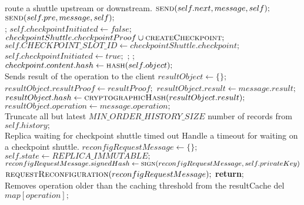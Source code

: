 \begin{algorithmic}[1]
 \Comment route a shuttle upstream or downstream.
    	\State $\Call{send}{self.next, message, self};$
    \Else
    	\State $\Call{send}{self.pre, message, self};$
	\EndIf
\EndFunction
\\

 
            \State {}
            \State {};
            \State $self.checkpointInitiated \gets false;$
            \State {}
        \Else 
            \State $checkpointShuttle.checkpointProof \cup \Call{createCheckpoint}{};$
             \State $self.CHECKPOINT\_SLOT\_ID \gets checkpointShuttle.checkpoint;$
            \State $self.checkpointInitiated \gets true;$
            \State {};
            \State {};
        \EndIf
    \EndIf
\EndFunction
\\

 
    \State $checkpoint.content.hash \gets \Call{hash}{self.object};$
\EndFunction
\\

 \Comment Sends result of the operation to the client
    \State $resultObject \gets \{\};$
    \State $resultObject.resultProof \gets resultProof;$
    \State $resultObject.result \gets message.result;$
    \State $resultObject.hash \gets \Call{cryptographicHash}{resultObject.result};$
    \State $resultObject.operation \gets message.operation;$
    \State {}
\EndFunction
\\

   \State \Comment Truncate all but latest $MIN\_ORDER\_HISTORY\_SIZE$ number of records from $self.history;$
\EndFunction
\\

\Require Replica waiting for checkpoint shuttle timed out
 \Comment Handle a timeout for waiting on a checkpoint shuttle.
	\State $reconfigRequestMessage\gets \{\};$
        \State $self.state\gets REPLICA\_IMMUTABLE;$
        \State $reconfigRequestMessage.signedHash\gets \Call{sign}{reconfigRequestMessage, self.privateKey}$
        \State $\Call{requestReconfiguration}{reconfigRequestMessage};$
        \State \textbf{return};
\EndFunction
\\

 \Comment Removes operation older than the caching threshold from the resultCache
            \State del $map[operation];$
        \EndIf
    \EndFor
\EndFunction
\\
\end{algorithmic}